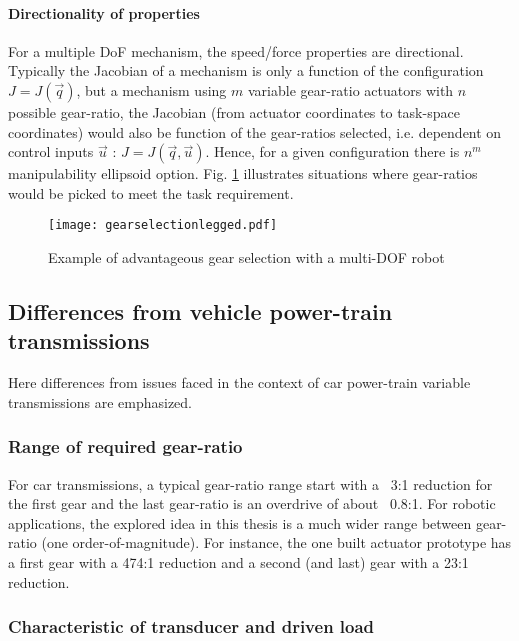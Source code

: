 \paragraph{Directionality of properties}
For a multiple DoF mechanism, the speed/force properties are directional. Typically the Jacobian of a mechanism is only a function of the configuration $J=J(\vec{q})$, but a mechanism using $m$ variable gear-ratio actuators with $n$ possible gear-ratio, the Jacobian (from actuator coordinates to task-space coordinates) would also be function of the gear-ratios selected, i.e. dependent on control inputs $\vec{u}$ : $J=J(\vec{q},\vec{u})$. Hence, for a given configuration there is $n^m$ manipulability ellipsoid option. Fig. \ref{fig:gearselectionlegged} illustrates situations where gear-ratios would be picked to meet the task requirement.


\begin{figure}[H]
	\centering
		\texttt{[image: gearselectionlegged.pdf]}
	\caption{Example of advantageous gear selection with a multi-DOF robot}
	\label{fig:gearselectionlegged}
\end{figure}


\subsection{Differences from vehicle power-train transmissions}

Here differences from issues faced in the context of car power-train variable transmissions are emphasized.

\subsubsection{Range of required gear-ratio}

For car transmissions, a typical gear-ratio range start with a ~3:1 reduction for the first gear and the last gear-ratio is an overdrive of about ~0.8:1. For robotic applications, the explored idea in this thesis is a much wider range between gear-ratio (one order-of-magnitude). For instance, the one built actuator prototype has a first gear with a 474:1 reduction and a second (and last) gear with a 23:1 reduction. 

\subsubsection{Characteristic of transducer and driven load}

